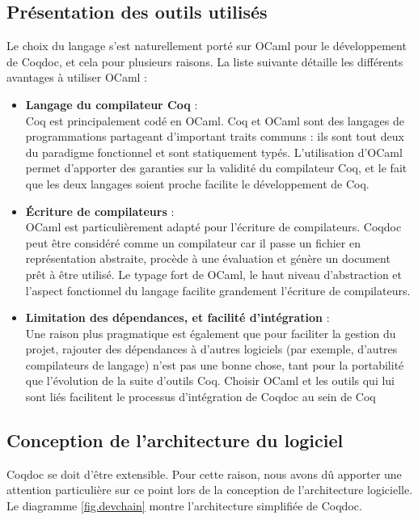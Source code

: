 \documentclass[a4paper, 11pt]{report}
\begin{document}
    \subsection{Présentation des outils utilisés}
    Le choix du langage s'est naturellement porté sur OCaml pour le
    développement de Coqdoc, et cela pour plusieurs raisons. La liste
    suivante détaille les différents avantages à utiliser OCaml :
    \begin{itemize}
      \item \textbf{Langage du compilateur Coq} : \\
        Coq est principalement codé en OCaml. Coq et OCaml sont des langages
        de programmations partageant d'important traits communs : ils sont tout
        deux du paradigme fonctionnel et sont statiquement typés. L'utilisation
        d'OCaml permet d'apporter des garanties sur la validité du compilateur
        Coq, et le fait que les deux langages soient proche facilite le
        développement de Coq.
      \item \textbf{Écriture de compilateurs} : \\
        OCaml est particulièrement adapté pour l'écriture de compilateurs.
        Coqdoc peut être considéré comme un compilateur car il passe un fichier
        en représentation abstraite, procède à une évaluation et génère un
        document prêt à être utilisé. Le typage fort de OCaml, le haut niveau
        d'abstraction et l'aspect fonctionnel du langage facilite grandement
        l'écriture de compilateurs.
      \item \textbf{Limitation des dépendances, et facilité d'intégration} : \\
        Une raison plus pragmatique est également que pour faciliter la gestion
        du projet, rajouter des dépendances à d'autres logiciels (par exemple,
        d'autres compilateurs de langage) n'est pas une bonne chose, tant pour
        la portabilité que l'évolution de la suite d'outils Coq. Choisir
        OCaml et les outils qui lui sont liés facilitent le processus
        d'intégration de Coqdoc au sein de Coq
    \end{itemize}
    \subsection{Conception de l'architecture du logiciel}
    Coqdoc se doit d'être extensible. Pour cette raison, nous avons dû apporter
    une attention particulière sur ce point lors de la conception de
    l'architecture logicielle.
    Le diagramme \cref{fig.devchain} montre l'architecture simplifiée de Coqdoc.
\end{document}
